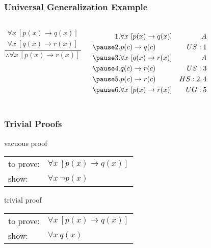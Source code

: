 \documentclass[dvipsnames]{beamer}
\begin{document}
\begin{frame}
  \frametitle{Universal Generalization Example}

  \begin{example}
    \begin{columns}
      \[
      \frac
        {
          \begin{array}{c}
            \forall x~[p(x) \rightarrow q(x)]\\
            \forall x~[q(x) \rightarrow r(x)]
          \end{array}
        }
        {
          \therefore \forall x~[p(x) \rightarrow r(x)]
        }
      \]

      \pause
      \begin{eqnarray*}
        1. & \forall x~[p(x) \rightarrow q(x)] & A\\\pause
        2. & p(c) \rightarrow q(c)             & US:1\\\pause
        3. & \forall x~[q(x) \rightarrow r(x)] & A\\\pause
        4. & q(c) \rightarrow r(c)             & US:3\\\pause
        5. & p(c) \rightarrow r(c)             & HS:2,4\\\pause
        6. & \forall x~[p(x) \rightarrow r(x)] & UG:5
      \end{eqnarray*}
    \end{columns}
  \end{example}
\end{frame}

\begin{frame}
  \frametitle{Trivial Proofs}

  \begin{block}{vacuous proof}
    \begin{tabular}{ll}
      to prove: & $\forall x~[p(x) \rightarrow q(x)]$\\
      show:     & $\forall x~\neg p(x)$
    \end{tabular}
  \end{block}

  \medskip
  \begin{block}{trivial proof}
    \begin{tabular}{ll}
      to prove: & $\forall x~[p(x) \rightarrow q(x)]$\\
      show:     & $\forall x~q(x)$
    \end{tabular}
  \end{block}
\end{frame}
\end{document}

